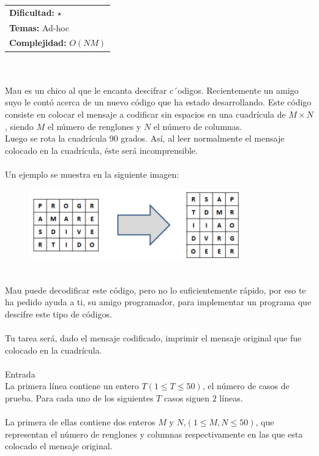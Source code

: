 \documentclass[12pt]{article}
\begin{document}
\hfill
\begin{tabular}{@{}l@{}}
\textbf{Dificultad:} $\star$ \\
\textbf{Temas:} Ad-hoc \\
\textbf{Complejidad:} $O(NM)$
\end{tabular}
\\
\\
Mau es un chico al que le encanta descifrar c´odigos. Recientemente un amigo suyo le contó acerca de un nuevo código que ha estado desarrollando. Este código consiste en colocar el mensaje a codificar sin espacios en una cuadrícula de $M × N$, siendo $M$ el número de renglones y $N$ el número de columnas. \\Luego se rota la cuadrícula 90 grados. Así, al leer normalmente el mensaje colocado en la cuadrícula, éste será incomprensible.\\
\\Un ejemplo se muestra en la siguiente imagen:
\begin{figure}[h!] 
\begin{center} 
\includegraphics[scale = 0.90]{fig.PNG}\hspace{50mm}  
\end{center} 
\end{figure}
\\Mau puede decodificar este código, pero no lo suficientemente rápido, por eso te ha pedido ayuda a ti, su amigo programador, para implementar un programa que descifre este tipo de códigos.\\
\\Tu tarea será, dado el mensaje codificado, imprimir el mensaje original que fue colocado en la cuadrícula.
\\
\\
\textrm{\large Entrada}
\\
La primera línea contiene un entero $T(1 ≤ T ≤ 50)$, el número de casos de prueba. Para cada uno de los siguientes $T$ casos siguen $2$ líneas.\\
\\La primera de ellas contiene dos enteros $M$ y $N$,$(1 ≤ M, N ≤ 50)$, que representan el número de renglones y columnas respectivamente en las que esta colocado el mensaje original.\\
\end{document}
